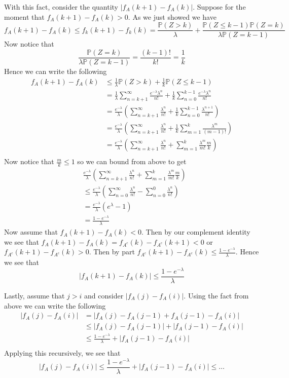 \documentclass[12pt]{article}  %
\newcommand{\prob}{{\mathbb{P}}}
\begin{document}
\begin{enumerate}
\begin{enumerate}
With this fact, consider the quantity $|f_A(k+1) - f_A(k)|$. Suppose for the moment that $f_A(k+1) - f_A(k) > 0$. As we just showed we have $$f_A(k+1) - f_A(k)\leq f_k(k+1) - f_k(k) = \frac{\prob(Z>k)}{\lambda} + \frac{\prob(Z\leq k -1)\prob(Z=k)}{\lambda\prob(Z = k-1)}$$
Now notice that $$\frac{\prob(Z=k)}{\lambda \prob(Z=k-1)} = \frac{(k-1)!}{k!} = \frac{1}{k}$$ Hence we can write the following 
\begin{align*}
f_A(k+1) - f_A(k) &\leq \frac{1}{\lambda}\prob(Z> k) + \frac{1}{k}\prob(Z\leq k-1)\\
&= \frac{1}{\lambda}\sum_{n=k+1}^{\infty}\frac{e^{-\lambda}\lambda^n}{n!} + \frac{1}{k}\sum_{n=0}^{k-1}\frac{e^{-\lambda}\lambda^n}{n!}\\
&= \frac{e^{-\lambda}}{\lambda}\left(\sum_{n=k+1}^{\infty}\frac{\lambda^n}{n!} + \frac{1}{k}\sum_{n=0}^{k-1}\frac{\lambda^{n+1}}{n!}\right)\\
&= \frac{e^{-\lambda}}{\lambda}\left(\sum_{n=k+1}^{\infty}\frac{\lambda^n}{n!} + \frac{1}{k}\sum_{m=1}^{k}\frac{\lambda^{m}}{(m-1)!}\right)\\
&= \frac{e^{-\lambda}}{\lambda}\left(\sum_{n=k+1}^{\infty}\frac{\lambda^n}{n!} + \sum_{m=1}^{k}\frac{\lambda^{m}}{m!}\frac{m}{k}\right)\\
\end{align*}
Now notice that $\frac{m}{k}\leq 1$ so we can bound from above to get 
\begin{align*}
&\frac{e^{-\lambda}}{\lambda}\left(\sum_{n=k+1}^{\infty}\frac{\lambda^n}{n!} + \sum_{m=1}^{k}\frac{\lambda^{m}}{m!}\frac{m}{k}\right)\\
&\leq \frac{e^{-\lambda}}{\lambda}\left(\sum_{n=0}^{\infty}\frac{\lambda^n}{n!} - \sum_{n=0}^{0}\frac{\lambda^n}{n!}\right)\\
&= \frac{e^{-\lambda}}{\lambda}\left(e^{\lambda} - 1\right)\\
&= \frac{1-e^{-\lambda}}{\lambda}
\end{align*}
Now assume that $f_A(k+1)-f_A(k)<0$. Then by our complement identity we see that $f_A(k+1)-f_A(k) = f_{A^c}(k) - f_{A^c}(k+1)<0$ or $f_{A^c}(k+1)-f_{A^c}(k) >0$. Then by part $f_{A^c}(k+1)-f_{A^c}(k)\leq \frac{1-e^{-\lambda}}{\lambda}$. Hence we see that $$|f_A(k+1)-f_A(k)|\leq \frac{1-e^{-\lambda}}{\lambda}$$

Lastly, assume that $j>i$ and consider $|f_A(j)-f_A(i)|$. Using the fact from above we can write the following 
\begin{align*}
|f_A(j)-f_A(i)| &= |f_A(j) - f_A(j-1) + f_A(j-1)-f_A(i)|\\
&\leq |f_A(j) - f_A(j-1)| + |f_A(j-1)-f_A(i)|\\
&\leq \frac{1-e^{-\lambda}}{\lambda} + |f_A(j-1)-f_A(i)|\\
\end{align*} 
Applying this recursively, we see that 
$$|f_A(j)-f_A(i)|\leq \frac{1-e^{-\lambda}}{\lambda} + |f_A(j-1)-f_A(i)|\leq \ldots $$ 


\end{enumerate}
\end{enumerate}
\end{document}
